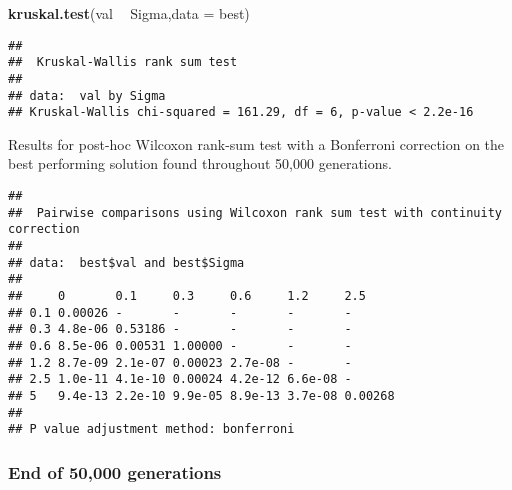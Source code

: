 \documentclass[]{book}
\newenvironment{Shaded}{\begin{snugshade}}{\end{snugshade}}
\newcommand{\DataTypeTok}[1]{\textcolor[rgb]{0.13,0.29,0.53}{#1}}
\newcommand{\KeywordTok}[1]{\textcolor[rgb]{0.13,0.29,0.53}{\textbf{#1}}}
\newcommand{\NormalTok}[1]{#1}
\newcommand{\OperatorTok}[1]{\textcolor[rgb]{0.81,0.36,0.00}{\textbf{#1}}}
\newcommand{\OtherTok}[1]{\textcolor[rgb]{0.56,0.35,0.01}{#1}}
\newcommand{\StringTok}[1]{\textcolor[rgb]{0.31,0.60,0.02}{#1}}
\begin{document}
\begin{Shaded}
\begin{Highlighting}[]
\KeywordTok{kruskal.test}\NormalTok{(val }\OperatorTok{~}\StringTok{ }\NormalTok{Sigma,}\DataTypeTok{data =}\NormalTok{ best)}
\end{Highlighting}
\end{Shaded}

\begin{verbatim}
## 
##  Kruskal-Wallis rank sum test
## 
## data:  val by Sigma
## Kruskal-Wallis chi-squared = 161.29, df = 6, p-value < 2.2e-16
\end{verbatim}

Results for post-hoc Wilcoxon rank-sum test with a Bonferroni correction on the best performing solution found throughout 50,000 generations.

\begin{Shaded}
\end{Shaded}

\begin{verbatim}
## 
##  Pairwise comparisons using Wilcoxon rank sum test with continuity correction 
## 
## data:  best$val and best$Sigma 
## 
##     0       0.1     0.3     0.6     1.2     2.5    
## 0.1 0.00026 -       -       -       -       -      
## 0.3 4.8e-06 0.53186 -       -       -       -      
## 0.6 8.5e-06 0.00531 1.00000 -       -       -      
## 1.2 8.7e-09 2.1e-07 0.00023 2.7e-08 -       -      
## 2.5 1.0e-11 4.1e-10 0.00024 4.2e-12 6.6e-08 -      
## 5   9.4e-13 2.2e-10 9.9e-05 8.9e-13 3.7e-08 0.00268
## 
## P value adjustment method: bonferroni
\end{verbatim}

\hypertarget{end-of-50000-generations-22}{%
\subsubsection{End of 50,000 generations}\label{end-of-50000-generations-22}}
\end{document}
